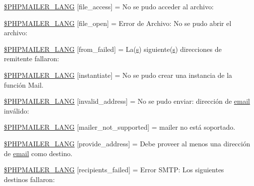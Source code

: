 \begin{DoxyCompactItemize}
\hyperlink{phpmailer_8lang-es_8php_a7e83349023b856ef9e5c46e30ae6d51e}{\$\+P\+H\+P\+M\+A\+I\+L\+E\+R\+\_\+\+L\+A\+NG} \mbox{[}\textquotesingle{}file\+\_\+access\textquotesingle{}\mbox{]} = \textquotesingle{}No se pudo acceder al archivo\+: \textquotesingle{}
\item 
\hyperlink{phpmailer_8lang-es_8php_a28d1a6517bf4c942a0ddd506188ad2e0}{\$\+P\+H\+P\+M\+A\+I\+L\+E\+R\+\_\+\+L\+A\+NG} \mbox{[}\textquotesingle{}file\+\_\+open\textquotesingle{}\mbox{]} = \textquotesingle{}Error de Archivo\+: No se pudo abrir el archivo\+: \textquotesingle{}
\item 
\hyperlink{phpmailer_8lang-es_8php_adf832ae12155a09be077c6d5e4fd7e22}{\$\+P\+H\+P\+M\+A\+I\+L\+E\+R\+\_\+\+L\+A\+NG} \mbox{[}\textquotesingle{}from\+\_\+failed\textquotesingle{}\mbox{]} = \textquotesingle{}La(\hyperlink{paste_2plugin_8min_8js_a43ae144ee2a4e493fea41ca42f795b14}{s}) siguiente(\hyperlink{paste_2plugin_8min_8js_a43ae144ee2a4e493fea41ca42f795b14}{s}) direcciones de remitente fallaron\+: \textquotesingle{}
\item 
\hyperlink{phpmailer_8lang-es_8php_ad58dde16780f4770ccf4dd282ea1f5ad}{\$\+P\+H\+P\+M\+A\+I\+L\+E\+R\+\_\+\+L\+A\+NG} \mbox{[}\textquotesingle{}instantiate\textquotesingle{}\mbox{]} = \textquotesingle{}No se pudo crear una instancia de la función Mail.\textquotesingle{}
\item 
\hyperlink{phpmailer_8lang-es_8php_a42d61bcea4c79599ecb44fd062f54d47}{\$\+P\+H\+P\+M\+A\+I\+L\+E\+R\+\_\+\+L\+A\+NG} \mbox{[}\textquotesingle{}invalid\+\_\+address\textquotesingle{}\mbox{]} = \textquotesingle{}No se pudo enviar\+: dirección de \hyperlink{actions_2account_8php_a011c66ae212438e0d7de7c0e40451bb3}{email} inválido\+: \textquotesingle{}
\item 
\hyperlink{phpmailer_8lang-es_8php_aa2ebcb8833ee83a7ad67401c4bb3a6ad}{\$\+P\+H\+P\+M\+A\+I\+L\+E\+R\+\_\+\+L\+A\+NG} \mbox{[}\textquotesingle{}mailer\+\_\+not\+\_\+supported\textquotesingle{}\mbox{]} = \textquotesingle{} mailer no está soportado.\textquotesingle{}
\item 
\hyperlink{phpmailer_8lang-es_8php_a8b97897c2406b7392b056f375feeefbb}{\$\+P\+H\+P\+M\+A\+I\+L\+E\+R\+\_\+\+L\+A\+NG} \mbox{[}\textquotesingle{}provide\+\_\+address\textquotesingle{}\mbox{]} = \textquotesingle{}Debe proveer al menos una dirección de \hyperlink{actions_2account_8php_a011c66ae212438e0d7de7c0e40451bb3}{email} como destino.\textquotesingle{}
\item 
\hyperlink{phpmailer_8lang-es_8php_a7589d30bb9b368327c2df015f3e6bcba}{\$\+P\+H\+P\+M\+A\+I\+L\+E\+R\+\_\+\+L\+A\+NG} \mbox{[}\textquotesingle{}recipients\+\_\+failed\textquotesingle{}\mbox{]} = \textquotesingle{}Error S\+M\+T\+P\+: Los siguientes destinos fallaron\+: \textquotesingle{}

\end{DoxyCompactItemize}
